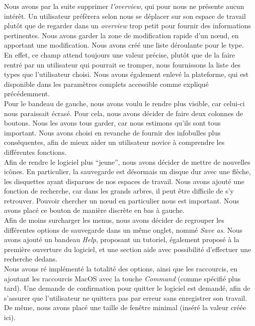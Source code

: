 \documentclass[12pt, a4paper]{article}
\begin{document}
Nous avons par la suite supprimer \emph{l'overview}, qui pour nous ne présente aucun intérêt. Un utilisateur préfèrera selon nous se déplacer sur son espace de travail plutôt que de regarder dans un \emph{overview} trop petit pour fournir des informations pertinentes. Nous avons garder la zone de modification rapide d'un nœud, en apportant une modification. Nous avons créé une liste déroulante pour le type. En effet, ce champ attend toujours une valeur précise, plutôt que de la faire rentré par un utilisateur qui pourrait se tromper, nous fournissons la liste des types que l'utilisateur choisi. Nous avons également enlevé la plateforme, qui est disponible dans les paramètres complets accessible comme expliqué précédemment.\\



Pour le bandeau de gauche, nous avons voulu le rendre plus visible, car celui-ci nous paraissait écrasé. Pour cela, nous avons décider de faire deux colonnes de boutons. Nous les avons tous garder, car nous estimons qu'ils sont tous important. Nous avons choisi en revanche de fournir des infobulles plus conséquentes, afin de mieux aider un utilisateur novice à comprendre les différentes fonctions.\\


Afin de rendre le logiciel plus ``jeune'', nous avons décider de mettre de nouvelles icônes. En particulier, la sauvegarde est désormais un disque dur avec une flèche, les disquettes ayant disparues de nos espaces de travail. Nous avons ajouté une fonction de recherche, car dans les grands arbres, il peut être difficile de s'y retrouver. Pouvoir chercher un nœud en particulier nous est important. Nous avons placé ce bouton de manière discrète en bas à gauche.\\


Afin de moins surcharger les menus, nous avons décider de regrouper les différentes options de sauvegarde dans un même onglet, nommé \emph{Save as}. Nous avons ajouté un bandeau \emph{Help}, proposant un tutoriel, également proposé à la première ouverture du logiciel, et une section aide avec possibilité d'effectuer une recherche dedans.\\


Nous avons ré implémenté la totalité des options, ainsi que les raccourcis, en ajoutant les raccourcis MacOS avec la touche \emph{Command} (comme spécifié plus tard). Une demande de confirmation pour quitter le logiciel est demandé, afin de s'assurer que l'utilisateur ne quittera pas par erreur sans enregistrer son travail. De même, nous avons placé une taille de fenêtre minimal (inséré la valeur créée ici).
\end{document}
